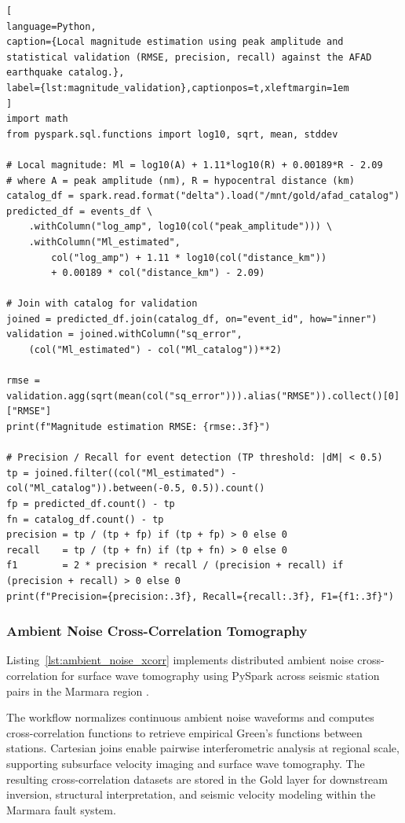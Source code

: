 \documentclass[data,article,accept,pdftex,moreauthors]{Definitions/mdpi}
\begin{document}
\begin{lstlisting}[
language=Python,
caption={Local magnitude estimation using peak amplitude and statistical validation (RMSE, precision, recall) against the AFAD earthquake catalog.},
label={lst:magnitude_validation},captionpos=t,xleftmargin=1em
]
import math
from pyspark.sql.functions import log10, sqrt, mean, stddev

# Local magnitude: Ml = log10(A) + 1.11*log10(R) + 0.00189*R - 2.09
# where A = peak amplitude (nm), R = hypocentral distance (km)
catalog_df = spark.read.format("delta").load("/mnt/gold/afad_catalog")
predicted_df = events_df \
    .withColumn("log_amp", log10(col("peak_amplitude"))) \
    .withColumn("Ml_estimated",
        col("log_amp") + 1.11 * log10(col("distance_km"))
        + 0.00189 * col("distance_km") - 2.09)

# Join with catalog for validation
joined = predicted_df.join(catalog_df, on="event_id", how="inner")
validation = joined.withColumn("sq_error",
    (col("Ml_estimated") - col("Ml_catalog"))**2)

rmse = validation.agg(sqrt(mean(col("sq_error"))).alias("RMSE")).collect()[0]["RMSE"]
print(f"Magnitude estimation RMSE: {rmse:.3f}")

# Precision / Recall for event detection (TP threshold: |dM| < 0.5)
tp = joined.filter((col("Ml_estimated") - col("Ml_catalog")).between(-0.5, 0.5)).count()
fp = predicted_df.count() - tp
fn = catalog_df.count() - tp
precision = tp / (tp + fp) if (tp + fp) > 0 else 0
recall    = tp / (tp + fn) if (tp + fn) > 0 else 0
f1        = 2 * precision * recall / (precision + recall) if (precision + recall) > 0 else 0
print(f"Precision={precision:.3f}, Recall={recall:.3f}, F1={f1:.3f}")
\end{lstlisting}

\subsubsection{Ambient Noise Cross-Correlation Tomography}

Listing~\ref{lst:ambient_noise_xcorr} implements distributed ambient noise cross-correlation for surface wave tomography using PySpark across seismic station pairs in the Marmara region \cite{Bensen2007}. 

The workflow normalizes continuous ambient noise waveforms and computes cross-correlation functions to retrieve empirical Green's functions between stations. Cartesian joins enable pairwise interferometric analysis at regional scale, supporting subsurface velocity imaging and surface wave tomography. The resulting cross-correlation datasets are stored in the Gold layer for downstream inversion, structural interpretation, and seismic velocity modeling within the Marmara fault system.
\end{document}
